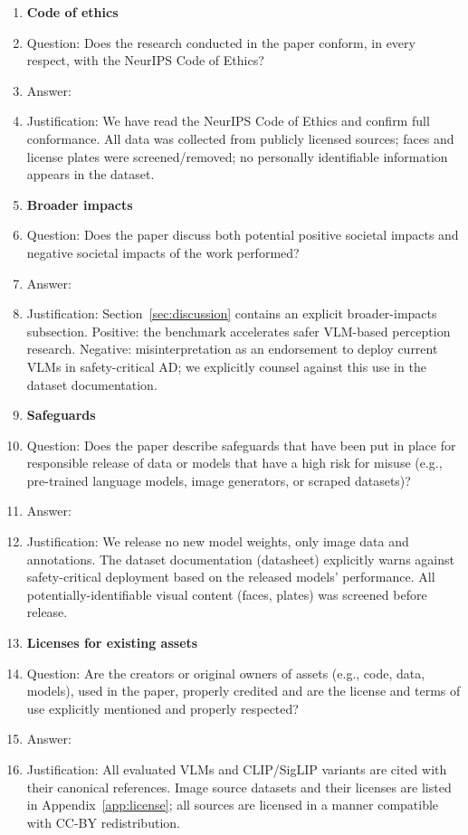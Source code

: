 \begin{enumerate}
\item {\bf Code of ethics}
    \item[] Question: Does the research conducted in the paper conform, in every respect, with the NeurIPS Code of Ethics?
    \item[] Answer: \answerYes{}
    \item[] Justification: We have read the NeurIPS Code
          of Ethics and confirm full conformance. All data was
          collected from publicly licensed sources; faces and license
          plates were screened/removed; no personally identifiable
          information appears in the dataset.

\item {\bf Broader impacts}
    \item[] Question: Does the paper discuss both potential positive societal impacts and negative societal impacts of the work performed?
    \item[] Answer: \answerYes{}
    \item[] Justification: Section~\ref{sec:discussion}
          contains an explicit broader-impacts subsection.
          Positive: the benchmark accelerates safer VLM-based
          perception research. Negative: misinterpretation as an
          endorsement to deploy current VLMs in safety-critical AD;
          we explicitly counsel against this use in the dataset
          documentation.

\item {\bf Safeguards}
    \item[] Question: Does the paper describe safeguards that have been put in place for responsible release of data or models that have a high risk for misuse (e.g., pre-trained language models, image generators, or scraped datasets)?
    \item[] Answer: \answerYes{}
    \item[] Justification: We release no new model weights,
          only image data and annotations. The dataset documentation
          (datasheet) explicitly warns against safety-critical
          deployment based on the released models' performance. All
          potentially-identifiable visual content (faces, plates) was
          screened before release.

\item {\bf Licenses for existing assets}
    \item[] Question: Are the creators or original owners of assets (e.g., code, data, models), used in the paper, properly credited and are the license and terms of use explicitly mentioned and properly respected?
    \item[] Answer: \answerYes{}
    \item[] Justification: All evaluated VLMs and CLIP/SigLIP
          variants are cited with their canonical references. Image
          source datasets and their licenses are listed in
          Appendix~\ref{app:license}; all sources are licensed in a
          manner compatible with CC-BY redistribution.


\end{enumerate}
